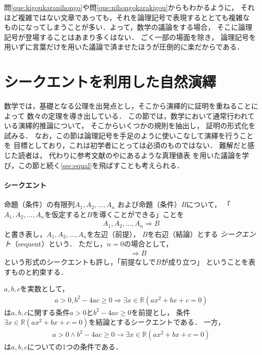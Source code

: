  問\ref{que:kigoukaranihongo}や問\ref{que:nihongokarakigou}からもわかるように，
 それほど複雑ではない文章であっても，それを論理記号で表現するととても複雑な
 ものになってしまうことが多い．よって，数学の議論をする場合，
 そこに論理記号が登場することはあまり多くはない．
 ごく一部の場面を除き，
 論理記号を用いずに言葉だけを用いた議論で済ませたほうが圧倒的に楽だからである．

 

 \section{シークエントを利用した自然演繹}
 \label{sec:sequent}
 数学では，基礎となる公理を出発点とし，そこから演繹的に証明を重ねることによって
 数々の定理を導き出している．
 この節では，数学において通常行われている演繹的推論について，
 そこからいくつかの規則を抽出し，
 証明の形式化を試みる．
 なお，この節は論理記号を手足のように使いこなして演繹を行うことを
 目標としており，これは初学者にとっては必須のものではない．
 難解だと感じた読者は，
 代わりに参考文献の\cite{kada}や\cite{utidatopo}にあるような真理値表
 を用いた議論を学び，この節と続く\ref{sec:equal}を飛ばすことも考えられる．

 \paragraph{シークエント}
 命題（条件）の有限列$A_1, A_2, \ldots , A_n$
 および命題（条件）$B$について，
 「$A_1, A_2, \ldots , A_n$を仮定すると$B$を導くことができる」ことを
 \begin{align}
   A_1 , A_2, \ldots , A_n \Longrightarrow B
   \label{eq:sequent}
 \end{align}
 と書き表し，$A_1, A_2 , \ldots ,A_n $を左辺（前提），
 $B$を右辺（結論）とする
 \emph{シークエント}（sequent）という．
 ただし，$n=0$の場合として，
 \begin{align}
   \qquad \Longrightarrow B
   \label{eq:sequentempty}
 \end{align}
 という形式のシークエントも許し，「前提なしで$B$が成り立つ」
 ということを表すものと約束する．

 \begin{ex}
   $a,  b,  c$を実数として，
   \begin{align*}
    a>0 , b^2-4ac \geq 0 \Longrightarrow 
    \exists x \in \mathbb{R} ( ax^2 +bx+c=0)
   \end{align*}  
   は$a,  b,  c$に関する条件$a>0$と$b^2 - 4ac \geq 0$を前提とし，
   条件$\exists x \in \mathbb{R} ( ax^2+bx+c=0)
   $を結論とするシークエントである．
   一方，
   \begin{align*}
     a>0 \land b^2 -4ac \geq 0 \to
     \exists x \in \mathbb{R} ( ax^2 +bx +c =0)
   \end{align*}
   は$a,  b,  c$についての1つの条件である．
 \end{ex}

